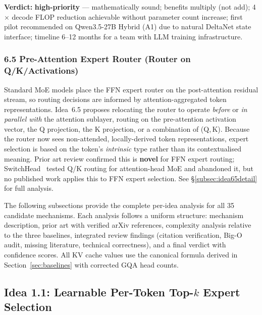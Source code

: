 \documentclass[11pt]{article}
\begin{document}
\textbf{Verdict:} \textbf{high-priority} --- mathematically sound; benefits multiply (not add); 4$\times$ decode FLOP reduction achievable without parameter count increase; first pilot recommended on Qwen3.5-27B Hybrid (A1) due to natural DeltaNet state interface; timeline 6--12 months for a team with LLM training infrastructure.


\subsubsection{6.5 Pre-Attention Expert Router (Router on Q/K/Activations)}
\label{sssec:idea65}
Standard MoE models place the FFN expert router on the post-attention residual stream, so routing decisions are informed by attention-aggregated token representations. Idea~6.5 proposes relocating the router to operate \emph{before} or \emph{in parallel with} the attention sublayer, routing on the pre-attention activation vector, the Q projection, the K projection, or a combination of (Q,\,K). Because the router now sees non-attended, locally-derived token representations, expert selection is based on the token's \emph{intrinsic} type rather than its contextualised meaning. Prior art review confirmed this is \textbf{novel} for FFN expert routing; SwitchHead~\cite{SwitchHeadNeurIPS2024} tested Q/K routing for attention-head MoE and abandoned it, but no published work applies this to FFN expert selection. See \S\ref{subsec:idea65detail} for full analysis.


\label{sec:analyses}

The following subsections provide the complete per-idea analysis for all 35 candidate mechanisms. Each analysis follows a uniform structure: mechanism description, prior art with verified arXiv references, complexity analysis relative to the three baselines, integrated review findings (citation verification, Big-O audit, missing literature, technical correctness), and a final verdict with confidence scores. All KV cache values use the canonical formula derived in Section~\ref{sec:baselines} with corrected GQA head counts.

\subsection{Idea 1.1: Learnable Per-Token Top-$k$ Expert Selection}
\label{subsec:idea-1-1}
\end{document}
